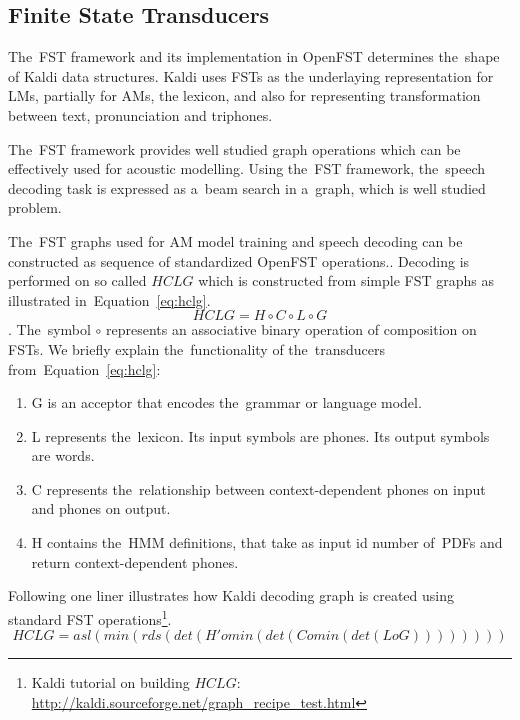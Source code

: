 \subsection{Finite State Transducers} 
\label{sec:fst}
The~\acl{FST} framework and its implementation in OpenFST determines the~shape of Kaldi data structures.
Kaldi uses \acp{FST} as the underlaying representation for \acp{LM}, partially for \acp{AM}, the lexicon, and also for representing transformation between text, pronunciation and triphones.

The~\ac{FST} framework provides well studied graph operations\cite{mohri2002weighted} which can be effectively used for acoustic modelling.
Using the~\ac{FST} framework, the~speech decoding task is expressed as a~beam search in a~graph, which is well studied problem.

The~\ac{FST} graphs used for \ac{AM} model training and speech decoding can be constructed as sequence of standardized OpenFST operations.\cite{mohri2002weighted}.
Decoding is performed on so called  $HCLG$ which is constructed from simple \ac{FST} graphs as illustrated in~Equation~\ref{eq:hclg}. 
\begin{equation} \label{eq:hclg}
HCLG = H\circ C\circ L\circ G
\end{equation}.
The~symbol $\circ$ represents an associative binary operation of composition on \acp{FST}.
We briefly explain the~functionality of the~transducers from~Equation~\ref{eq:hclg}:
\begin{enumerate}
    \item G is an acceptor that encodes the~grammar or language model.
    \item L represents the~lexicon. Its input symbols are phones. Its output symbols are words.
    \item C represents the~relationship between context-dependent phones on input and phones on output.
    \item H contains the~\ac{HMM} definitions, that take as input id number of~\acp{PDF} and return context-dependent phones.
\end{enumerate}

Following one liner illustrates how Kaldi decoding graph is created using standard \ac{FST} operations\footnote{Kaldi tutorial on building $HCLG$: \url{http://kaldi.sourceforge.net/graph_recipe_test.html}}.\cite{mohri2002weighted}
\begin{equation}
   HCLG = asl(min(rds(det(H' o min(det(C o min(det(L o G)))))))) 
\end{equation}

